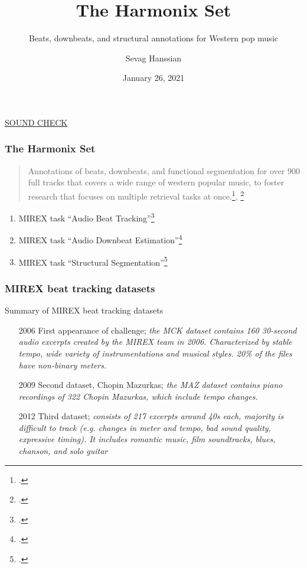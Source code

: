 \documentclass{beamer}
\title{The Harmonix Set}
\subtitle{Beats, downbeats, and structural annotations for Western pop music}
\author{Sevag Hanssian}
\date{January 26, 2021}
\institute{MUMT 621, Winter 2021}
\begin{document}
\begin{frame}
\maketitle
\href{run:./gangnam.wav}{SOUND CHECK}
\end{frame}

\begin{frame}
	\frametitle{The Harmonix Set}
	\begin{quote}
	Annotations of beats, downbeats, and functional segmentation for over 900 full tracks that covers a wide range of western popular music, to foster research that focuses on multiple retrieval tasks at once.\footcite{harmonixpaper}, \footcite{harmonixrepo}
	\end{quote}
	\begin{enumerate}
		\item
			MIREX task ``Audio Beat Tracking''\footcite{mirexabt}
		\item
			MIREX task ``Audio Downbeat Estimation''\footcite{mirexade}
		\item
			MIREX task ``Structural Segmentation''\footcite{mirexss}
	\end{enumerate}
\end{frame}


\begin{frame}
	\frametitle{MIREX beat tracking datasets}
	Summary of MIREX beat tracking datasets
	\begin{enumerate}
		\item[2006]
			First appearance of challenge; \textit{the MCK dataset contains 160 30-second audio excerpts created by the MIREX team in 2006. Characterized by stable tempo, wide variety of instrumentations and musical styles. 20\% of the files have non-binary meters.}
		\item[2009]
			Second dataset, Chopin Mazurkas; \textit{the MAZ dataset contains piano recordings of 322 Chopin Mazurkas, which include tempo changes.}
		\item[2012]
			Third dataset; \textit{consists of 217 excerpts around 40s each, majority is difficult to track (e.g. changes in meter and tempo, bad sound quality, expressive timing). It includes romantic music, film soundtracks, blues, chanson, and solo guitar}
	\end{enumerate}
\end{frame}
\end{document}
